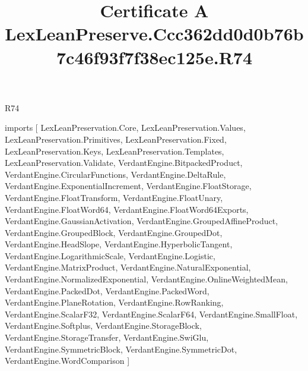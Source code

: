 \begin{lexlean}{R74}
\title{Certificate A LexLeanPreserve.Ccc362dd0d0b76b7c46f93f7f38ec125e.R74}
\begin{coremodule}
imports [
  LexLeanPreservation.Core,
  LexLeanPreservation.Values,
  LexLeanPreservation.Primitives,
  LexLeanPreservation.Fixed,
  LexLeanPreservation.Keys,
  LexLeanPreservation.Templates,
  LexLeanPreservation.Validate,
  VerdantEngine.BitpackedProduct,
  VerdantEngine.CircularFunctions,
  VerdantEngine.DeltaRule,
  VerdantEngine.ExponentialIncrement,
  VerdantEngine.FloatStorage,
  VerdantEngine.FloatTransform,
  VerdantEngine.FloatUnary,
  VerdantEngine.FloatWord64,
  VerdantEngine.FloatWord64Exports,
  VerdantEngine.GaussianActivation,
  VerdantEngine.GroupedAffineProduct,
  VerdantEngine.GroupedBlock,
  VerdantEngine.GroupedDot,
  VerdantEngine.HeadSlope,
  VerdantEngine.HyperbolicTangent,
  VerdantEngine.LogarithmicScale,
  VerdantEngine.Logistic,
  VerdantEngine.MatrixProduct,
  VerdantEngine.NaturalExponential,
  VerdantEngine.NormalizedExponential,
  VerdantEngine.OnlineWeightedMean,
  VerdantEngine.PackedDot,
  VerdantEngine.PackedWord,
  VerdantEngine.PlaneRotation,
  VerdantEngine.RowRanking,
  VerdantEngine.ScalarF32,
  VerdantEngine.ScalarF64,
  VerdantEngine.SmallFloat,
  VerdantEngine.Softplus,
  VerdantEngine.StorageBlock,
  VerdantEngine.StorageTransfer,
  VerdantEngine.SwiGlu,
  VerdantEngine.SymmetricBlock,
  VerdantEngine.SymmetricDot,
  VerdantEngine.WordComparison
]


\end{coremodule}
\end{lexlean}

